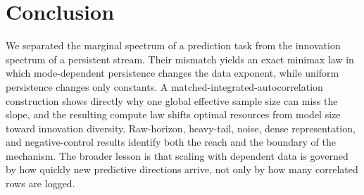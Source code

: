 \section{Conclusion}

We separated the marginal spectrum of a prediction task from the innovation
spectrum of a persistent stream.  Their mismatch yields an exact minimax law in
which mode-dependent persistence changes the data exponent, while uniform
persistence changes only constants.  A matched-integrated-autocorrelation
construction shows directly why one global effective sample size can miss the
slope, and the resulting compute law shifts optimal resources from model size
toward innovation diversity.  Raw-horizon, heavy-tail, noise, dense
representation, and negative-control results identify both the reach and the
boundary of the mechanism.  The broader lesson is that scaling with dependent
data is governed by how quickly new predictive directions arrive, not only by
how many correlated rows are logged.
